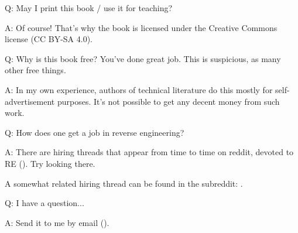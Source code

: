 \par Q: May I print this book / use it for teaching?
\par A: Of course! That's why the book is licensed under the Creative Commons license (CC BY-SA 4.0).

\par Q: Why is this book free? You've done great job. This is suspicious, as many other free things.
\par A: In my own experience, authors of technical literature do this mostly for self-advertisement purposes. It's not possible to get any decent money from such work.

\par Q: How does one get a job in reverse engineering?
\par A: There are hiring threads that appear from time to time on reddit, devoted to RE\FNURLREDDIT{}
(\RedditHiringThread{}).
Try looking there.

A somewhat related hiring thread can be found in the  subreddit: \NetsecHiringThread{}.

\par Q: I have a question...
\par A: Send it to me by email (\EMAIL).

